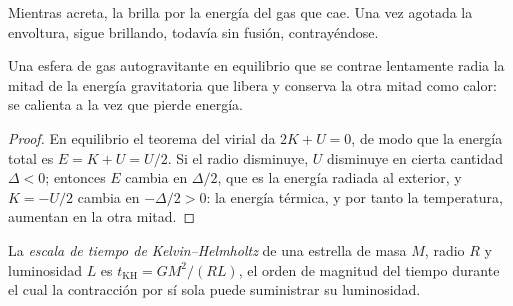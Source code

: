 \begin{omfigure}
\par{}
\end{omfigure}

Mientras acreta, la  brilla por la energía del gas que cae. Una vez
agotada la envoltura, sigue brillando, todavía sin fusión,
contrayéndose.

\begin{proposition}
\label{prop:b2:ism-star-formation:contraction}
Una esfera de gas autogravitante en equilibrio que se contrae lentamente radia
la mitad de la energía gravitatoria que libera y conserva la otra mitad como calor:
se calienta a la vez que pierde energía.
\end{proposition}

\begin{proof}
En equilibrio el teorema del virial da $2K + U = 0$, de modo que la energía total es
$E = K + U = U/2$. Si el radio disminuye, $U$ disminuye en cierta cantidad
$\Delta < 0$; entonces $E$ cambia en $\Delta/2$, que es la energía radiada
al exterior, y $K = -U/2$ cambia en $-\Delta/2 > 0$: la energía térmica, y por tanto
la temperatura, aumentan en la otra mitad.
\end{proof}

\begin{definition}\label{def:b2:ism-star-formation:kh-time}
La \emph{escala de tiempo de Kelvin--Helmholtz}
de una estrella de masa $M$, radio $R$ y luminosidad $L$ es
$t_{\mathrm{KH}} = GM^2/(RL)$, el orden de magnitud del tiempo durante el cual
la contracción por sí sola puede suministrar su luminosidad.
\end{definition}

